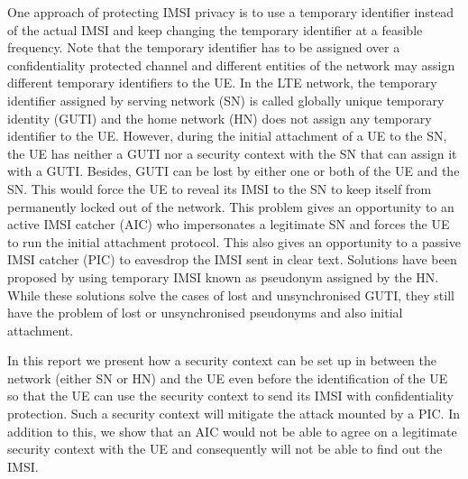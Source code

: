 \documentclass[runningheads,a4paper]{llncs} %
\begin{document}
One approach of protecting IMSI privacy is to use a temporary identifier instead of the actual IMSI and keep changing the temporary identifier at a feasible frequency. Note that the temporary identifier has to be assigned over a confidentiality protected channel and different entities of the network may assign different temporary identifiers to the UE. In the LTE network, the temporary identifier assigned by serving network (SN) is called globally unique temporary identity (GUTI) and the home network (HN) does not assign any temporary identifier to the UE. However, during the initial attachment of a UE to the SN, the UE has neither a GUTI nor a security context with the SN that can assign it with a GUTI. Besides, GUTI can be lost by either one or both of the UE and the SN. This would force the UE to reveal its IMSI to the SN to keep itself from permanently locked out of the network. This problem gives an opportunity to an active IMSI catcher (AIC) who impersonates a legitimate SN and forces the UE to run the initial attachment protocol. This also gives an opportunity to a passive IMSI catcher (PIC) to eavesdrop the IMSI sent in clear text. Solutions \cite{pseudonym_valtteri_philip, pseudonym_ericsson} have been proposed by using temporary IMSI known as pseudonym assigned by the HN. While these solutions solve the cases of lost and unsynchronised GUTI, they still have the problem of lost or unsynchronised pseudonyms and also initial attachment.

In this report we present how a security context can be set up in between the network (either SN or HN) and the UE even before the identification of the UE so that the UE can use the security context to send its IMSI with confidentiality protection. Such a security context will mitigate the attack mounted by a PIC. In addition to this, we show that an AIC would not be able to agree on a legitimate security context with the UE and consequently will not be able to find out the IMSI.
\end{document}
